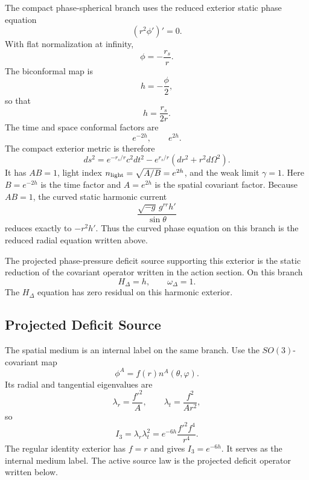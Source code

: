 \documentclass[12pt,a4paper]{article}
\begin{document}
The compact phase-spherical branch uses the reduced exterior static phase equation
\[
\left(r^2\phi'\right)'=0.
\]
With flat normalization at infinity,
\[
\phi=-\frac{r_s}{r}.
\]
The biconformal map is
\[
h=-\frac{\phi}{2},
\]
so that
\[
h=\frac{r_s}{2r}.
\]
The time and space conformal factors are
\[
e^{-2h},\qquad e^{2h}.
\]
The compact exterior metric is therefore
\[
ds^2=e^{-r_s/r}c^2dt^2
-e^{r_s/r}\left(dr^2+r^2d\Omega^2\right).
\]
It has $AB=1$, light index $n_{\rm light}=\sqrt{A/B}=e^{2h}$, and the weak limit $\gamma=1$. Here $B=e^{-2h}$ is the time factor and $A=e^{2h}$ is the spatial covariant factor.
Because $AB=1$, the curved static harmonic current
\[
\frac{\sqrt{-g}\,g^{rr}h'}{\sin\theta}
\]
reduces exactly to $-r^2h'$. Thus the curved phase equation on this branch is
the reduced radial equation written above.

The projected phase-pressure deficit source supporting this exterior is the
static reduction of the covariant operator written in the action section. On this branch
\[
H_\Delta=h,\qquad \omega_\Delta=1.
\]
The $H_\Delta$ equation has zero residual on this harmonic exterior.

\subsection{Projected Deficit Source}

The spatial medium is an internal label on the same branch. Use the
$SO(3)$-covariant map
\[
\phi^A=f(r)n^A(\theta,\varphi).
\]
Its radial and tangential eigenvalues are
\[
\lambda_r=\frac{f'^2}{A},\qquad
\lambda_t=\frac{f^2}{Ar^2},
\]
so
\[
I_3=\lambda_r\lambda_t^2
=e^{-6h}\frac{f'^2f^4}{r^4}.
\]
The regular identity exterior has $f=r$ and gives $I_3=e^{-6h}$. It serves as
the internal medium label. The active source law is the projected deficit
operator written below.
\end{document}
